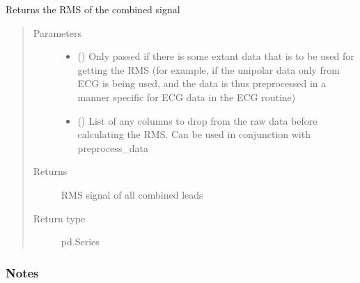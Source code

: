 \documentclass[letterpaper,10pt,english]{sphinxmanual}
\begin{document}
\begin{fulllineitems}
\begin{fulllineitems}
\label{\detokenize{_autosummary/signalanalysis.general.Signal:id1}}
\sphinxAtStartPar
Returns the RMS of the combined signal
\begin{quote}\begin{description}
\item[{Parameters}] \leavevmode\begin{itemize}
\item {} 
\sphinxAtStartPar
{} (\sphinxstyleliteralemphasis{\sphinxupquote{, }}) \textendash{} Only passed if there is some extant data that is to be used for getting the RMS (for example,
if the unipolar data only from ECG is being used, and the data is thus preprocessed in a manner specific
for ECG data in the ECG routine)

\item {} 
\sphinxAtStartPar
{} (\sphinxstyleliteralemphasis{\sphinxupquote{, }}) \textendash{} List of any columns to drop from the raw data before calculating the RMS. Can be used in conjunction with
preprocess\_data

\end{itemize}

\item[{Returns}] \leavevmode
\sphinxAtStartPar
{} \textendash{} RMS signal of all combined leads

\item[{Return type}] \leavevmode
\sphinxAtStartPar
pd.Series

\end{description}\end{quote}
\subsubsection*{Notes}


\end{fulllineitems}
\end{fulllineitems}
\end{document}
